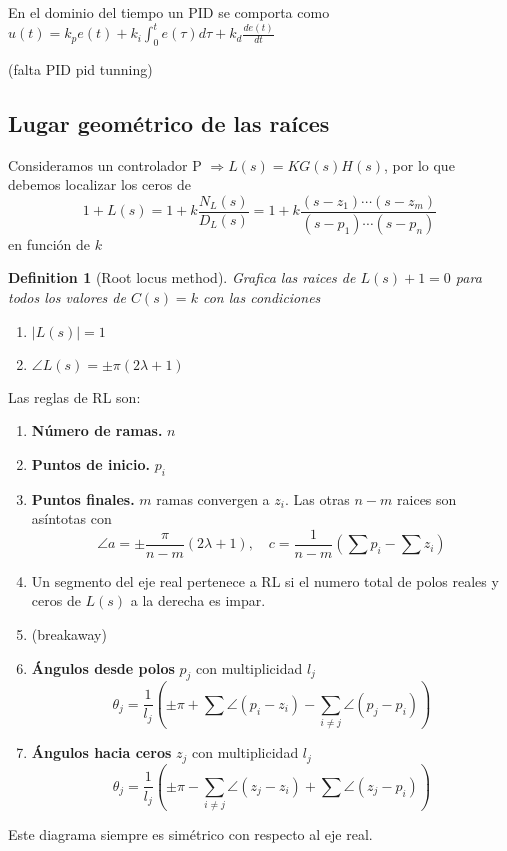 \documentclass[leqno]{article}
\newtheorem*{definition}{Definition}
\begin{document}
En el dominio del tiempo un PID se comporta como $u(t) = k_pe(t)+k_i\int_0^te(\tau )d\tau + k_d \frac{de(t)}{dt}$

(falta PID pid tunning)

\subsection{Lugar geométrico de las raíces}
Consideramos un controlador P $\Rightarrow L(s) = KG(s)H(s)$, por lo que debemos localizar los ceros de 
\[
1+L(s) = 1+k \frac{N_L(s)}{D_L(s)} = 1 + k \frac{(s-z_1)\cdots (s-z_m)}{(s-p_1)\cdots(s-p_n)}
\] 
en función de $k$

\begin{definition}[Root locus method] Grafica las raices de $L(s)+1=0$ para todos los valores de  $C(s)=k$ con las condiciones
   \begin{enumerate}[topsep=-6pt, itemsep=0pt]
    \item $|L(s)|=1$ 
	\item  $\angle L(s) = \pm \pi(2\lambda+1)$
  \end{enumerate}
\end{definition}

Las reglas de RL son:
\begin{enumerate}[topsep=-6pt, itemsep=0pt]
  \item \textbf{Número de ramas.} $n$
  \item  \textbf{Puntos de inicio.} $p_i$
  \item  \textbf{Puntos finales.} $m$ ramas convergen a  $z_i$. Las otras  $n-m$ raices son asíntotas con
	 \[
	\angle a = \pm \frac{\pi}{n-m}(2\lambda+1), \quad c = \frac{1}{n-m} \left( \sum p_i - \sum z_i \right) 
	\] 
  \item Un segmento del eje real pertenece a RL si el numero total de polos reales y ceros de $L(s)$ a la derecha es impar.
  \item (breakaway)
  \item \textbf{Ángulos desde polos} $p_j$ con multiplicidad  $l_j$
	 \[
	\theta _j = \frac{1}{l_j} \left( \pm \pi + \sum \angle(p_i-z_i) - \sum_{i\neq j} \angle(p_j-p_i) \right) 
	\] 
  \item \textbf{Ángulos hacia ceros} $z_j$ con multiplicidad  $l_j$
	 \[
	\theta _j = \frac{1}{l_j} \left( \pm \pi - \sum_{i\neq j} \angle(z_j-z_i) + \sum \angle(z_j-p_i) \right) 
	\] 
\end{enumerate}
Este diagrama siempre es simétrico con respecto al eje real.
\end{document}
